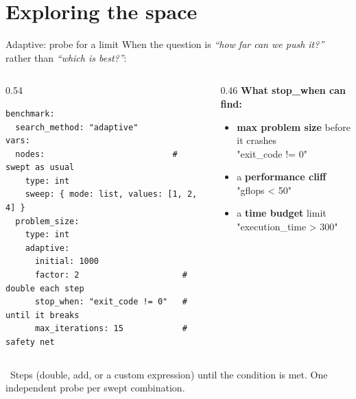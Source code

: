 \documentclass[aspectratio=169,11pt]{beamer}
\newcommand{\code}[1]{{\ttfamily\small\color{iopsNavy}#1}}
\newcommand{\hl}[1]{{\color{iopsPink}\bfseries #1}}
\begin{document}
\section{Exploring the space}

\begin{frame}[fragile]{Adaptive: probe for a limit}
  When the question is \emph{``how far can we push it?''} rather than
  \emph{``which is best?''}:
  \begin{columns}[T]
    \begin{column}{0.54\textwidth}
\begin{lstlisting}[style=yaml,basicstyle=\ttfamily\fontsize{6}{7.1}\selectfont,columns=fixed]
benchmark:
  search_method: "adaptive"
vars:
  nodes:                          # swept as usual
    type: int
    sweep: { mode: list, values: [1, 2, 4] }
  problem_size:
    type: int
    adaptive:
      initial: 1000
      factor: 2                     # double each step
      stop_when: "exit_code != 0"   # until it breaks
      max_iterations: 15            # safety net
\end{lstlisting}
    \end{column}
    \begin{column}{0.46\textwidth}
      \textbf{What \code{stop\_when} can find:}
      \begin{itemize}
        \item \hl{max problem size} before it crashes\\
          {\footnotesize\code{"exit\_code != 0"}}
        \item a \hl{performance cliff}\\
          {\footnotesize\code{"gflops < 50"}}
        \item a \hl{time budget} limit\\
          {\footnotesize\code{"execution\_time > 300"}}
      \end{itemize}
    \end{column}
  \end{columns}
  \begin{keybox}
    \faArrowsAltH~Steps (double, add, or a custom expression) until the
    condition is met. One independent probe per swept combination.
  \end{keybox}
\end{frame}
\end{document}
